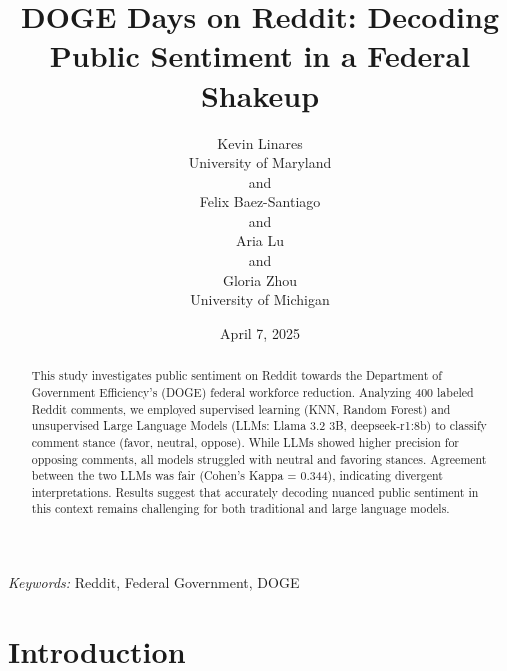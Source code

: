 \documentclass[
  12pt]{article}
\begin{document}
\def\spacingset#1{\renewcommand{\baselinestretch}%
{#1}\small\normalsize} \spacingset{1}



\date{April 7, 2025}
\title{\bf DOGE Days on Reddit: Decoding Public Sentiment in a Federal
Shakeup}
\author{
Kevin Linares\\
University of Maryland\\
and\\Felix Baez-Santiago\\
and\\Aria Lu\\
and\\Gloria Zhou\\
University of Michigan\\
}
\maketitle

\bigskip
\bigskip
\begin{abstract}
This study investigates public sentiment on Reddit towards the
Department of Government Efficiency's (DOGE) federal workforce
reduction. Analyzing 400 labeled Reddit comments, we employed supervised
learning (KNN, Random Forest) and unsupervised Large Language Models
(LLMs: Llama 3.2 3B, deepseek-r1:8b) to classify comment stance (favor,
neutral, oppose). While LLMs showed higher precision for opposing
comments, all models struggled with neutral and favoring stances.
Agreement between the two LLMs was fair (Cohen's Kappa = 0.344),
indicating divergent interpretations. Results suggest that accurately
decoding nuanced public sentiment in this context remains challenging
for both traditional and large language models.
\end{abstract}

\noindent%
{\it Keywords:} Reddit, Federal Government, DOGE
\vfill

\newpage
\spacingset{1.9} %


\section{Introduction}\label{sec-intro}
\end{document}
